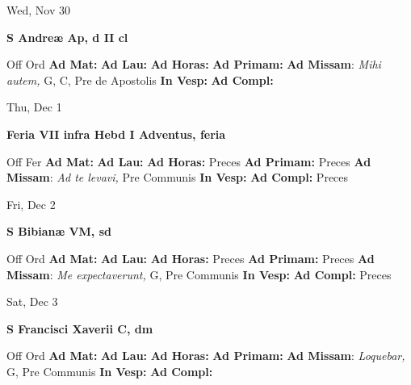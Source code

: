 \documentclass[10pt]{article}
\begin{document}
\begin{minipage}{3.5in}
\vspace{2em}\begin{center}
Wed, Nov 30
\end{center}\textbf{ \large S Andreæ Ap, \textnormal{\normalsize d II cl}}
\begin{justify}
Off Ord
\textbf{Ad Mat: }
\textbf{Ad Lau: }
\textbf{Ad Horas: }
\textbf{Ad Primam: }
\textbf{Ad Missam}: \textit{Mihi autem,} G, C, Pre de Apostolis
\textbf{In Vesp: }
\textbf{Ad Compl: }\end{justify}
\end{minipage}



\begin{minipage}{3.5in}
\vspace{2em}\begin{center}
Thu, Dec 1
\end{center}\textbf{ \large Feria VII infra Hebd I Adventus, \textnormal{\normalsize feria}}
\begin{justify}
Off Fer
\textbf{Ad Mat: }
\textbf{Ad Lau: }
\textbf{Ad Horas: }Preces
\textbf{Ad Primam: }Preces
\textbf{Ad Missam}: \textit{Ad te levavi,} Pre Communis
\textbf{In Vesp: }
\textbf{Ad Compl: }Preces\end{justify}
\end{minipage}



\begin{minipage}{3.5in}
\vspace{2em}\begin{center}
Fri, Dec 2
\end{center}\textbf{ \large S Bibianæ VM, \textnormal{\normalsize sd}}
\begin{justify}
Off Ord
\textbf{Ad Mat: }
\textbf{Ad Lau: }
\textbf{Ad Horas: }Preces
\textbf{Ad Primam: }Preces
\textbf{Ad Missam}: \textit{Me expectaverunt,} G, Pre Communis
\textbf{In Vesp: }
\textbf{Ad Compl: }Preces\end{justify}
\end{minipage}



\begin{minipage}{3.5in}
\vspace{2em}\begin{center}
Sat, Dec 3
\end{center}\textbf{ \large S Francisci Xaverii C, \textnormal{\normalsize dm}}
\begin{justify}
Off Ord
\textbf{Ad Mat: }
\textbf{Ad Lau: }
\textbf{Ad Horas: }
\textbf{Ad Primam: }
\textbf{Ad Missam}: \textit{Loquebar,} G, Pre Communis
\textbf{In Vesp: }
\textbf{Ad Compl: }\end{justify}
\end{minipage}
\end{document}
